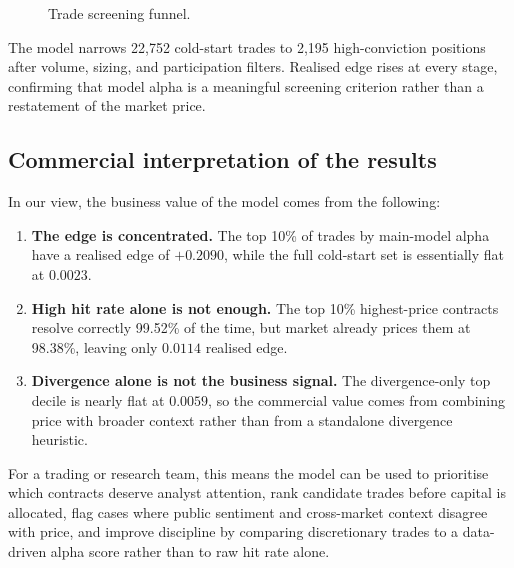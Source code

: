 \documentclass[11pt,a4paper]{article}
\newcommand{\edit}[1]{#1}
\newcommand{\ColdAllEdge}{\edit{0.0023}}
\newcommand{\DivTopEdge}{\edit{0.0059}}
\newcommand{\MainTopEdge}{\edit{0.2090}}
\newcommand{\PriceTopEdge}{\edit{0.0114}}
\begin{document}
\begin{figure}[H]
\caption{Trade screening funnel.}
\label{fig:funnel}
\end{figure}

\edit{The model narrows 22,752 cold-start trades to 2,195 high-conviction positions after volume, sizing, and participation filters. Realised edge rises at every stage, confirming that model alpha is a meaningful screening criterion rather than a restatement of the market price.}
\subsection{Commercial interpretation of the results}

In our view, the business value of the model comes from the following:

\begin{enumerate}
    \item \textbf{The edge is concentrated.} The top 10\% of trades by main-model alpha have a realised edge of $+\MainTopEdge$, while the full cold-start set is essentially flat at $\ColdAllEdge$.
    \item \textbf{High hit rate alone is not enough.} The top 10\% highest-price contracts resolve correctly 99.52\% of the time, but market already prices them at 98.38\%, leaving only $\PriceTopEdge$ realised edge.
    \item \textbf{Divergence alone is not the business signal.} The divergence-only top decile is nearly flat at $\DivTopEdge$, so the commercial value comes from combining price with broader context rather than from a standalone divergence heuristic.
\end{enumerate}

For a trading or research team, this means the model can be used to prioritise which contracts deserve analyst attention, rank candidate trades before capital is allocated, flag cases where public sentiment and cross-market context disagree with price, and improve discipline by comparing discretionary trades to a data-driven alpha score rather than to raw hit rate alone.
\end{document}
